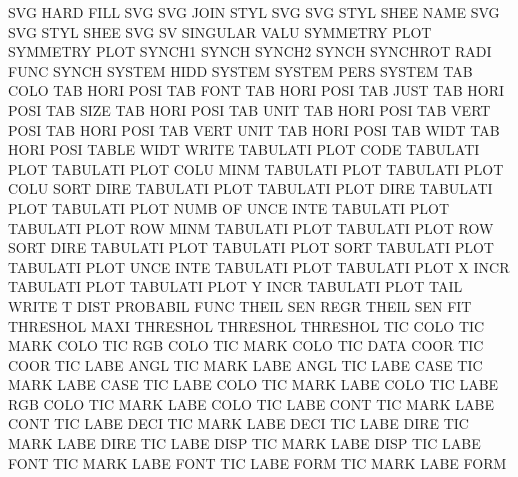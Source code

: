 SVG      HARD FILL                      SVG
SVG      JOIN STYL                      SVG
SVG      STYL SHEE NAME                 SVG
SVG      STYL SHEE                      SVG
SV                                      SINGULAR VALU
SYMMETRY PLOT                           SYMMETRY PLOT
SYNCH1                                  SYNCH
SYNCH2                                  SYNCH
SYNCHROT RADI FUNC                      SYNCH
SYSTEM   HIDD                           SYSTEM
SYSTEM   PERS                           SYSTEM
TAB      COLO                           TAB HORI POSI
TAB      FONT                           TAB HORI POSI
TAB      JUST                           TAB HORI POSI
TAB      SIZE                           TAB HORI POSI
TAB      UNIT                           TAB HORI POSI
TAB      VERT POSI                      TAB HORI POSI
TAB      VERT UNIT                      TAB HORI POSI
TAB      WIDT                           TAB HORI POSI
TABLE    WIDT                           WRITE
TABULATI PLOT CODE                      TABULATI PLOT
TABULATI PLOT COLU MINM                 TABULATI PLOT
TABULATI PLOT COLU SORT DIRE            TABULATI PLOT
TABULATI PLOT DIRE                      TABULATI PLOT
TABULATI PLOT NUMB OF   UNCE INTE       TABULATI PLOT
TABULATI PLOT ROW  MINM                 TABULATI PLOT
TABULATI PLOT ROW  SORT DIRE            TABULATI PLOT
TABULATI PLOT SORT                      TABULATI PLOT
TABULATI PLOT UNCE INTE                 TABULATI PLOT
TABULATI PLOT X    INCR                 TABULATI PLOT
TABULATI PLOT Y    INCR                 TABULATI PLOT
TAIL                                    WRITE
T        DIST                           PROBABIL FUNC
THEIL    SEN  REGR                      THEIL    SEN  FIT
THRESHOL MAXI                           THRESHOL
THRESHOL                                THRESHOL
TIC      COLO                           TIC      MARK COLO
TIC      RGB  COLO                      TIC      MARK COLO
TIC      DATA COOR                      TIC      COOR
TIC      LABE ANGL                      TIC      MARK LABE ANGL
TIC      LABE CASE                      TIC      MARK LABE CASE
TIC      LABE COLO                      TIC      MARK LABE COLO
TIC      LABE RGB  COLO                 TIC      MARK LABE COLO
TIC      LABE CONT                      TIC      MARK LABE CONT
TIC      LABE DECI                      TIC      MARK LABE DECI
TIC      LABE DIRE                      TIC      MARK LABE DIRE
TIC      LABE DISP                      TIC      MARK LABE DISP
TIC      LABE FONT                      TIC      MARK LABE FONT
TIC      LABE FORM                      TIC      MARK LABE FORM
